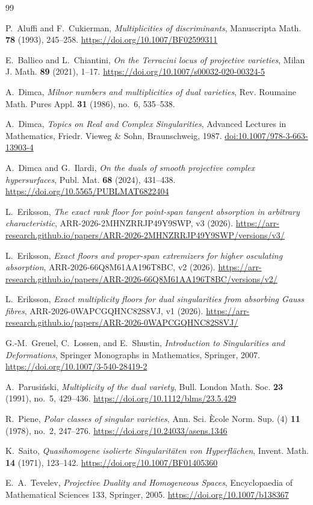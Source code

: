 \documentclass[11pt,a4paper]{article}
\theoremstyle{definition}
\begin{document}
\begin{thebibliography}{99}

P.~Aluffi and F.~Cukierman,
\emph{Multiplicities of discriminants},
Manuscripta Math. \textbf{78} (1993), 245--258.
\url{https://doi.org/10.1007/BF02599311}

E.~Ballico and L.~Chiantini,
\emph{On the Terracini locus of projective varieties},
Milan J. Math. \textbf{89} (2021), 1--17.
\url{https://doi.org/10.1007/s00032-020-00324-5}

A.~Dimca,
\emph{Milnor numbers and multiplicities of dual varieties},
Rev. Roumaine Math. Pures Appl. \textbf{31} (1986), no.~6, 535--538.

A.~Dimca,
\emph{Topics on Real and Complex Singularities},
Advanced Lectures in Mathematics, Friedr. Vieweg \& Sohn, Braunschweig, 1987.
\href{https://doi.org/10.1007/978-3-663-13903-4}{doi:10.1007/978-3-663-13903-4}

A.~Dimca and G.~Ilardi,
\emph{On the duals of smooth projective complex hypersurfaces},
Publ. Mat. \textbf{68} (2024), 431--438.
\url{https://doi.org/10.5565/PUBLMAT6822404}

L.~Eriksson,
\emph{The exact rank floor for point-span tangent absorption in arbitrary
characteristic}, ARR-2026-2MHNZRRJP49Y9SWP, v3 (2026).
\url{https://arr-research.github.io/papers/ARR-2026-2MHNZRRJP49Y9SWP/versions/v3/}

L.~Eriksson,
\emph{Exact floors and proper-span extremizers for higher osculating
absorption}, ARR-2026-66Q8M61AA196T8BC, v2 (2026).
\url{https://arr-research.github.io/papers/ARR-2026-66Q8M61AA196T8BC/versions/v2/}

L.~Eriksson,
\emph{Exact multiplicity floors for dual singularities from absorbing Gauss
fibres}, ARR-2026-0WAPCGQHNC82S8VJ, v1 (2026).
\url{https://arr-research.github.io/papers/ARR-2026-0WAPCGQHNC82S8VJ/}

G.-M.~Greuel, C.~Lossen, and E.~Shustin,
\emph{Introduction to Singularities and Deformations},
Springer Monographs in Mathematics, Springer, 2007.
\url{https://doi.org/10.1007/3-540-28419-2}

A.~Parusi\'nski,
\emph{Multiplicity of the dual variety},
Bull. London Math. Soc. \textbf{23} (1991), no.~5, 429--436.
\url{https://doi.org/10.1112/blms/23.5.429}

R.~Piene,
\emph{Polar classes of singular varieties},
Ann. Sci. \`Ecole Norm. Sup. (4) \textbf{11} (1978), no.~2, 247--276.
\url{https://doi.org/10.24033/asens.1346}

K.~Saito,
\emph{Quasihomogene isolierte Singularit\"aten von Hyperfl\"achen},
Invent. Math. \textbf{14} (1971), 123--142.
\url{https://doi.org/10.1007/BF01405360}

E.~A.~Tevelev,
\emph{Projective Duality and Homogeneous Spaces},
Encyclopaedia of Mathematical Sciences 133, Springer, 2005.
\url{https://doi.org/10.1007/b138367}

\end{thebibliography}
\end{document}
